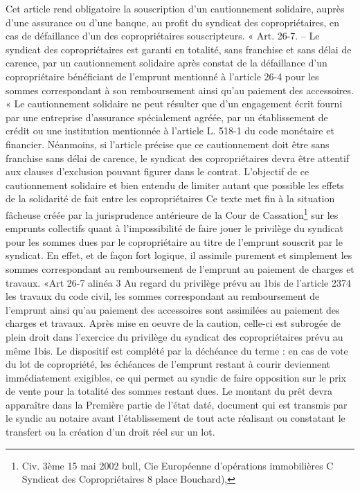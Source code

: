 			Cet article rend obligatoire la souscription d'un cautionnement solidaire, auprès d'une assurance ou d'une banque, au profit du syndicat des copropriétaires, en cas de défaillance d'un des copropriétaires souscripteurs.
			« Art. 26-7. – Le syndicat des copropriétaires est garanti en totalité, sans franchise et sans délai de carence, par un cautionnement solidaire après constat de la défaillance d’un copropriétaire bénéficiant de l’emprunt mentionné à l’article 26-4 pour les sommes correspondant à son remboursement ainsi qu’au paiement des accessoires.
			« Le cautionnement solidaire ne peut résulter que d’un engagement écrit fourni par une entreprise d’assurance spécialement agréée, par un établissement de crédit ou une institution mentionnée à l’article L. 518-1 du code monétaire et financier.
			Néanmoins, si l'article précise que ce cautionnement doit être sans franchise sans délai de carence, le syndicat des copropriétaires devra être attentif aux clauses d'exclusion pouvant figurer dans le contrat.
			L'objectif de ce cautionnement solidaire et bien entendu de limiter autant que possible les effets de la solidarité de fait entre les copropriétaires
			Ce texte met fin à la situation fâcheuse créée par la jurisprudence antérieure de la Cour de Cassation\footnote{Civ. 3ème 15 mai 2002 bull, Cie Européenne d’opérations immobilières C Syndicat des Copropriétaires 8 place Bouchard),} sur les emprunts collectifs quant à l'impossibilité de faire jouer le privilège du syndicat pour les sommes dues par le copropriétaire au titre de l'emprunt souscrit par le
			syndicat. En effet, et de façon fort logique, il assimile purement et simplement les sommes correspondant au remboursement de l'emprunt au paiement de charges et travaux.
			«Art 26-7 alinéa 3
			Au regard du privilège prévu au 1\degres bis de l’article 2374 les travaux du code civil, les sommes correspondant au remboursement de l’emprunt ainsi qu’au paiement des accessoires sont assimilées au paiement des charges et travaux. Après mise en oeuvre de la caution, celle-ci est subrogée de plein droit dans l’exercice du privilège du syndicat des copropriétaires prévu au même 1\degres bis.
			Le dispositif est complété par la déchéance du terme : en cas de vote du lot de copropriété, les échéances de l'emprunt restant à courir deviennent immédiatement exigibles, ce qui permet au syndic de faire opposition sur le prix de vente pour la totalité des sommes restant dues.
			Le montant du prêt devra apparaître dans la Première partie de l’état daté, document qui est transmis par le syndic au notaire avant l’établissement de tout acte réalisant ou constatant le transfert ou la création d’un droit réel sur un lot.
